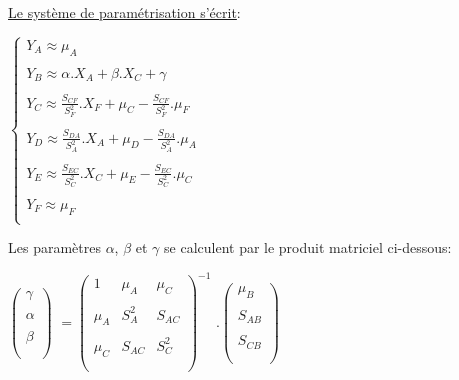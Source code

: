 \documentclass[a4paper]{article}
\begin{document}
\begin{appendices}
\underline{Le système de paramétrisation s'écrit}:

$\left\lbrace 
\begin{array}{lcl}
Y_{A}\approx\mu_{A}\\ \\
Y_{B}\approx\alpha.X_{A}+\beta.X_{C}+\gamma\\ \\
Y_{C}\approx \frac{S_{CF}}{S_{F}^2}.X_{F}+\mu_{C}-\frac{S_{CF}}{S_{F}^2}.\mu_{F}\\ \\
Y_{D}\approx \frac{S_{DA}}{S_{A}^2}.X_{A}+\mu_{D}-\frac{S_{DA}}{S_{A}^2}.\mu_{A}\\ \\
Y_{E}\approx \frac{S_{EC}}{S_{C}^2}.X_{C}+\mu_{E}-\frac{S_{EC}}{S_{C}^2}.\mu_{C}\\ \\
Y_{F}\approx \mu_{F}\\

\end{array}\right.$


Les paramètres $\alpha$, $\beta$ et $\gamma$ se calculent par le produit matriciel ci-dessous:

$\begin{pmatrix}
\gamma\\ \\
\alpha\\ \\
\beta\\ \\
\end{pmatrix}$
$=\begin{pmatrix}
1&\mu_{A}&\mu_{C}\\ \\

\mu_{A}&S_{A}^{2}&S_{AC} \\ \\

\mu_{C}&S_{AC}&S_{C}^{2}\\ \\
\end{pmatrix}^{-1}$
$.\begin{pmatrix}
\mu_{B}\\ \\
S_{AB}\\ \\
S_{CB}\\ \\

\end{pmatrix}$





\end{appendices}
\end{document}
